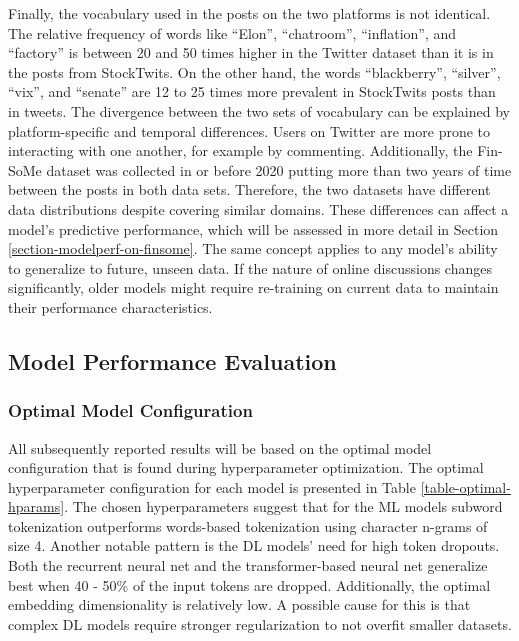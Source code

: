 Finally, the vocabulary used in the posts on the two platforms is not identical. The relative frequency of words like ``Elon'', ``chatroom'', ``inflation'', and ``factory'' is between 20 and 50 times higher in the Twitter dataset than it is in the posts from StockTwits. On the other hand, the words ``blackberry'', ``silver'', ``vix'', and ``senate'' are 12 to 25 times more prevalent in StockTwits posts than in tweets. The divergence between the two sets of vocabulary can be explained by platform-specific and temporal differences. Users on Twitter are more prone to interacting with one another, for example by commenting. Additionally, the Fin-SoMe dataset was collected in or before 2020 putting more than two years of time between the posts in both data sets. Therefore, the two datasets have different data distributions despite covering similar domains. These differences can affect a model's predictive performance, which will be assessed in more detail in Section \ref{section-modelperf-on-finsome}. The same concept applies to any model's ability to generalize to future, unseen data. If the nature of online discussions changes significantly, older models might require re-training on current data to maintain their performance characteristics.

\subsection{Model Performance Evaluation}

\subsubsection{Optimal Model Configuration}
All subsequently reported results will be based on the optimal model configuration that is found during hyperparameter optimization.
The optimal hyperparameter configuration for each model is presented in Table \ref{table-optimal-hparams}. The chosen hyperparameters suggest that for the ML models subword tokenization outperforms words-based tokenization using character n-grams of size 4. Another notable pattern is the DL models' need for high token dropouts. Both the recurrent neural net and the transformer-based neural net generalize best when 40 - 50\% of the input tokens are dropped. Additionally, the optimal embedding dimensionality is relatively low. A possible cause for this is that complex DL models require stronger regularization to not overfit smaller datasets.

